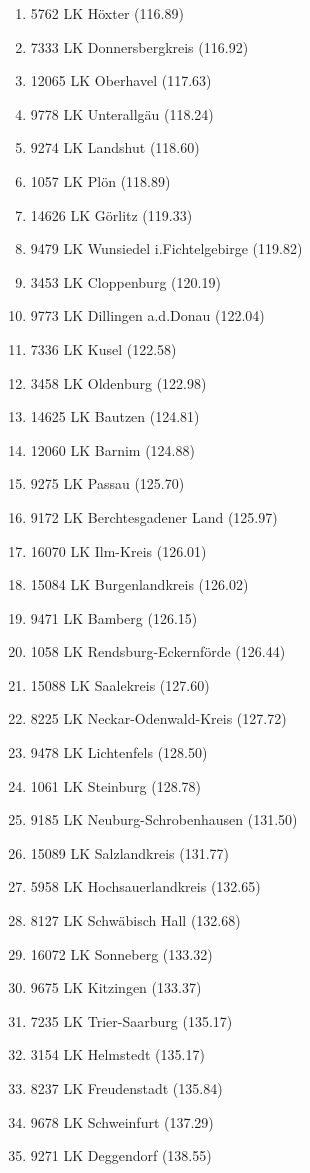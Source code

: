 \begin{enumerate}[itemsep=-6mm]
\item 5762 LK Höxter (116.89)
\item 7333 LK Donnersbergkreis (116.92)
\item 12065 LK Oberhavel (117.63)
\item 9778 LK Unterallgäu (118.24)
\item 9274 LK Landshut (118.60)
\item 1057 LK Plön (118.89)
\item 14626 LK Görlitz (119.33)
\item 9479 LK Wunsiedel i.Fichtelgebirge (119.82)
\item 3453 LK Cloppenburg (120.19)
\item 9773 LK Dillingen a.d.Donau (122.04)
\item 7336 LK Kusel (122.58)
\item 3458 LK Oldenburg (122.98)
\item 14625 LK Bautzen (124.81)
\item 12060 LK Barnim (124.88)
\item 9275 LK Passau (125.70)
\item 9172 LK Berchtesgadener Land (125.97)
\item 16070 LK Ilm-Kreis (126.01)
\item 15084 LK Burgenlandkreis (126.02)
\item 9471 LK Bamberg (126.15)
\item 1058 LK Rendsburg-Eckernförde (126.44)
\item 15088 LK Saalekreis (127.60)
\item 8225 LK Neckar-Odenwald-Kreis (127.72)
\item 9478 LK Lichtenfels (128.50)
\item 1061 LK Steinburg (128.78)
\item 9185 LK Neuburg-Schrobenhausen (131.50)
\item 15089 LK Salzlandkreis (131.77)
\item 5958 LK Hochsauerlandkreis (132.65)
\item 8127 LK Schwäbisch Hall (132.68)
\item 16072 LK Sonneberg (133.32)
\item 9675 LK Kitzingen (133.37)
\item 7235 LK Trier-Saarburg (135.17)
\item 3154 LK Helmstedt (135.17)
\item 8237 LK Freudenstadt (135.84)
\item 9678 LK Schweinfurt (137.29)
\item 9271 LK Deggendorf (138.55)

\end{enumerate}
